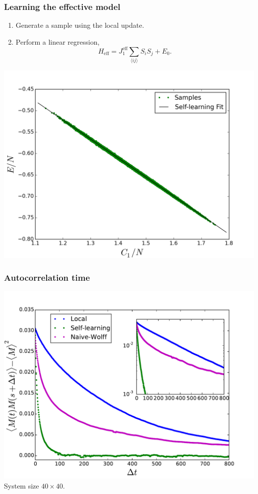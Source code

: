 \documentclass[xcolor=table, 10pt, aspectratio=169]{beamer}
\begin{document}
\begin{frame}
  \frametitle{Learning the effective model}
    \begin{enumerate}
      \item Generate a sample using the local update.
      \item Perform a linear regression,
      \[  H_{\text{eff}} = J_1^{\text{eff}}\sum_{\langle ij\rangle}S_iS_j+E_0.\]
    \end{enumerate}
    \centering
    \includegraphics[width=.5\columnwidth]{dist_fit.png}
\end{frame}


\begin{frame}
  \frametitle{Autocorrelation time}
  \centering
  \includegraphics[width=.6\textwidth]{auto_decay}\\
  System size $40\times40$.
\end{frame}
\end{document}
